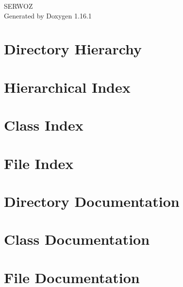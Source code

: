 \documentclass[twoside]{book}
\newcommand{\+}{\discretionary{\mbox{\scriptsize$\hookleftarrow$}}{}{}}
\newcommand{\clearemptydoublepage}{%
    \newpage{\pagestyle{empty}\cleardoublepage}%
  }
\begin{document}
  \raggedbottom
  \begin{titlepage}
  \vspace*{7cm}
  \begin{center}%
  {\Large SERWOZ}\\
  \vspace*{1cm}
  {\large Generated by Doxygen 1.16.1}\\
  \end{center}
  \end{titlepage}
  \clearemptydoublepage
  \tableofcontents
  \clearemptydoublepage
\chapter{Directory Hierarchy}

\chapter{Hierarchical Index}

\chapter{Class Index}

\chapter{File Index}

\chapter{Directory Documentation}





\chapter{Class Documentation}








\chapter{File Documentation}
















  \backmatter
  \newpage
  \clearemptydoublepage
  \printindex
\end{document}
